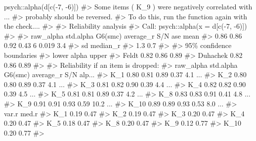 \documentclass[
  letterpaper,
]{krantz}
\makeatletter
\newenvironment{Shaded}{\begin{snugshade}}{\end{snugshade}}
\newcommand{\CommentTok}[1]{\textcolor[rgb]{0.37,0.37,0.37}{#1}}
\newcommand{\DecValTok}[1]{\textcolor[rgb]{0.68,0.00,0.00}{#1}}
\newcommand{\FunctionTok}[1]{\textcolor[rgb]{0.28,0.35,0.67}{#1}}
\newcommand{\NormalTok}[1]{\textcolor[rgb]{0.00,0.23,0.31}{#1}}
\newcommand{\SpecialCharTok}[1]{\textcolor[rgb]{0.37,0.37,0.37}{#1}}
\newenvironment{kframe}{%
\medskip{}
\setlength{\fboxsep}{.8em}
 \def\at@end@of@kframe{}%
 \ifinner\ifhmode%
  \def\at@end@of@kframe{\end{minipage}}%
  \begin{minipage}{\columnwidth}%
 \fi\fi%
 \def\FrameCommand##1{\hskip\@totalleftmargin \hskip-\fboxsep
 \colorbox{shadecolor}{##1}\hskip-\fboxsep
     \hskip-\linewidth \hskip-\@totalleftmargin \hskip\columnwidth}%
 \MakeFramed {\advance\hsize-\width
   \@totalleftmargin\z@ \linewidth\hsize
   \@setminipage}}%
 {\par\unskip\endMakeFramed%
 \at@end@of@kframe}
\renewenvironment{Shaded}{\begin{kframe}}{\end{kframe}}
\makeatother
\begin{document}
\begin{Shaded}
\begin{Highlighting}[]
\NormalTok{psych}\SpecialCharTok{::}\FunctionTok{alpha}\NormalTok{(d[}\FunctionTok{c}\NormalTok{(}\SpecialCharTok{{-}}\DecValTok{7}\NormalTok{, }\SpecialCharTok{{-}}\DecValTok{6}\NormalTok{)])}
\CommentTok{\#\textgreater{} Some items ( K\_9 ) were negatively correlated with ...}
\CommentTok{\#\textgreater{} probably should be reversed.  }
\CommentTok{\#\textgreater{} To do this, run the function again with the \textquotesingle{}check....}
\CommentTok{\#\textgreater{} }
\CommentTok{\#\textgreater{} Reliability analysis   }
\CommentTok{\#\textgreater{} Call: psych::alpha(x = d[c({-}7, {-}6)])}
\CommentTok{\#\textgreater{} }
\CommentTok{\#\textgreater{}   raw\_alpha std.alpha G6(smc) average\_r S/N   ase mean}
\CommentTok{\#\textgreater{}       0.86      0.86    0.92      0.43   6 0.019  3.4}
\CommentTok{\#\textgreater{}   sd median\_r}
\CommentTok{\#\textgreater{}  1.3      0.7}
\CommentTok{\#\textgreater{} }
\CommentTok{\#\textgreater{}     95\% confidence boundaries }
\CommentTok{\#\textgreater{}          lower alpha upper}
\CommentTok{\#\textgreater{} Feldt     0.82  0.86  0.89}
\CommentTok{\#\textgreater{} Duhachek  0.82  0.86  0.89}
\CommentTok{\#\textgreater{} }
\CommentTok{\#\textgreater{}  Reliability if an item is dropped:}
\CommentTok{\#\textgreater{}      raw\_alpha std.alpha G6(smc) average\_r  S/N alp...}
\CommentTok{\#\textgreater{} K\_1       0.80      0.81    0.89      0.37  4.1    ...}
\CommentTok{\#\textgreater{} K\_2       0.80      0.80    0.89      0.37  4.1    ...}
\CommentTok{\#\textgreater{} K\_3       0.81      0.82    0.90      0.39  4.4    ...}
\CommentTok{\#\textgreater{} K\_4       0.82      0.82    0.90      0.39  4.5    ...}
\CommentTok{\#\textgreater{} K\_5       0.81      0.81    0.89      0.37  4.2    ...}
\CommentTok{\#\textgreater{} K\_8       0.83      0.83    0.91      0.41  4.8    ...}
\CommentTok{\#\textgreater{} K\_9       0.91      0.91    0.93      0.59 10.2    ...}
\CommentTok{\#\textgreater{} K\_10      0.89      0.89    0.93      0.53  8.0    ...}
\CommentTok{\#\textgreater{}      var.r med.r}
\CommentTok{\#\textgreater{} K\_1   0.19  0.47}
\CommentTok{\#\textgreater{} K\_2   0.19  0.47}
\CommentTok{\#\textgreater{} K\_3   0.20  0.47}
\CommentTok{\#\textgreater{} K\_4   0.20  0.47}
\CommentTok{\#\textgreater{} K\_5   0.18  0.47}
\CommentTok{\#\textgreater{} K\_8   0.20  0.47}
\CommentTok{\#\textgreater{} K\_9   0.12  0.77}
\CommentTok{\#\textgreater{} K\_10  0.20  0.77}
\CommentTok{\#\textgreater{} }

\end{Highlighting}
\end{Shaded}
\end{document}
